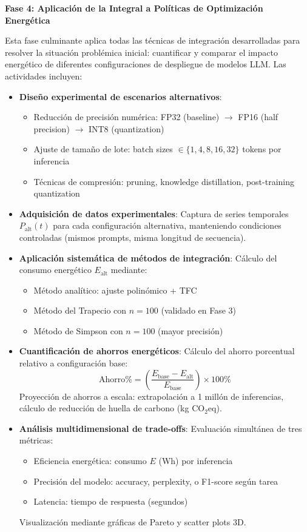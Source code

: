 \textbf{Fase 4: Aplicación de la Integral a Políticas de Optimización Energética}

Esta fase culminante aplica todas las técnicas de integración desarrolladas para resolver la situación problémica inicial: cuantificar y comparar el impacto energético de diferentes configuraciones de despliegue de modelos LLM. Las actividades incluyen:

\begin{itemize}
    \item \textbf{Diseño experimental de escenarios alternativos}:
    \begin{itemize}
        \item Reducción de precisión numérica: FP32 (baseline) $\to$ FP16 (half precision) $\to$ INT8 (quantization)
        \item Ajuste de tamaño de lote: batch sizes $\in \{1, 4, 8, 16, 32\}$ tokens por inferencia
        \item Técnicas de compresión: pruning, knowledge distillation, post-training quantization
    \end{itemize}
    
    \item \textbf{Adquisición de datos experimentales}: Captura de series temporales $P_{\text{alt}}(t)$ para cada configuración alternativa, manteniendo condiciones controladas (mismos prompts, misma longitud de secuencia).
    
    \item \textbf{Aplicación sistemática de métodos de integración}: Cálculo del consumo energético $E_{\text{alt}}$ mediante:
    \begin{itemize}
        \item Método analítico: ajuste polinómico + TFC
        \item Método del Trapecio con $n = 100$ (validado en Fase 3)
        \item Método de Simpson con $n = 100$ (mayor precisión)
    \end{itemize}
    
    \item \textbf{Cuantificación de ahorros energéticos}: Cálculo del ahorro porcentual relativo a configuración base:
    \[
    \text{Ahorro\%} = \left( \frac{E_{\text{base}} - E_{\text{alt}}}{E_{\text{base}}} \right) \times 100\%
    \]
    Proyección de ahorros a escala: extrapolación a 1 millón de inferencias, cálculo de reducción de huella de carbono (kg CO$_2$eq).
    
    \item \textbf{Análisis multidimensional de trade-offs}: Evaluación simultánea de tres métricas:
    \begin{itemize}
        \item Eficiencia energética: consumo $E$ (Wh) por inferencia
        \item Precisión del modelo: accuracy, perplexity, o F1-score según tarea
        \item Latencia: tiempo de respuesta (segundos)
    \end{itemize}
    Visualización mediante gráficas de Pareto y scatter plots 3D.
    

\end{itemize}
